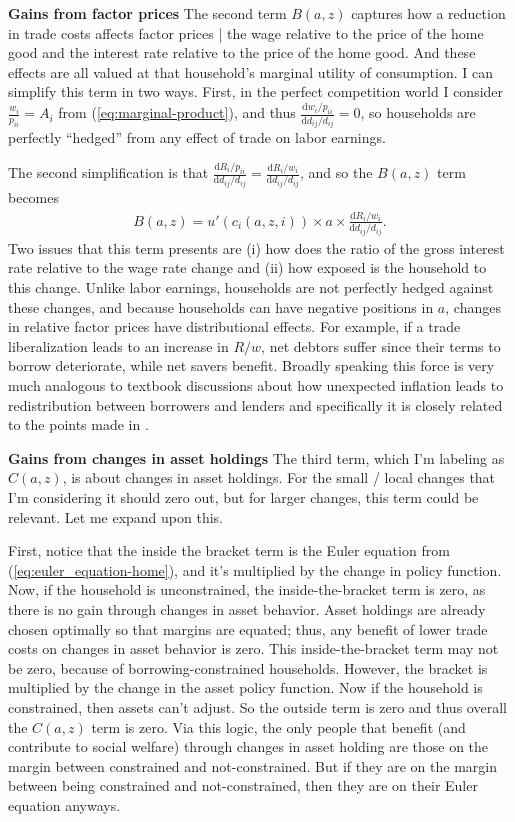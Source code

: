 \documentclass[12pt,pdftex]{article}
\begin{document}
\begin{onehalfspacing}
\textbf{Gains from factor prices} The second term $B(a,z)$ captures how a reduction in trade costs affects factor prices | the wage relative to the price of the home good and the interest rate relative to the price of the home good. And these effects are all valued at that household's marginal utility of consumption. I can simplify this term in two ways. First, in the perfect competition world I consider $\frac{w_i}{p_{ii}} = A_{i}$ from (\ref{eq:marginal-product}), and thus $\frac{\mathrm{d} w_{i} / p_{ii}}{\mathrm{d} d_{ij} / d_{ij}} = 0$, so households are perfectly ``hedged'' from any effect of trade on labor earnings.

The second simplification is that $\frac{\mathrm{d} R_{i} / p_{ii}}{\mathrm{d} d_{ij} / d_{ij}} = \frac{\mathrm{d} R_{i} / w_{i}}{\mathrm{d} d_{ij} / d_{ij}}$, and so the $B(a,z)$ term becomes
\begin{align}
B(a,z) = u'(c_{i}(a,z,i)) \times  a \times \frac{\mathrm{d} R_{i} / w_{i}}{\mathrm{d} d_{ij} / d_{ij}}.
\end{align}
Two issues that this term presents are (i) how does the ratio of the gross interest rate relative to the wage rate change and (ii) how exposed is the household to this change. Unlike labor earnings, households are not perfectly hedged against these changes, and because households can have negative positions in $a$, changes in relative factor prices have distributional effects.  For example, if a trade liberalization leads to an increase in $R / w$, net debtors suffer since their terms to borrow deteriorate, while net savers benefit. Broadly speaking this force is very much analogous to textbook discussions about how unexpected inflation leads to redistribution between borrowers and lenders and specifically it is closely related to the points made in \citet{auclert2019monetary}.


\textbf{Gains from changes in asset holdings} The third term, which I'm labeling as $C(a,z)$, is about changes in asset holdings. For the small / local changes that I'm considering it should zero out, but for larger changes, this term could be relevant. Let me expand upon this.

First, notice that the inside the bracket term is the Euler equation from (\ref{eq:euler_equation-home}), and it's multiplied by the change in policy function. Now, if the household is unconstrained, the inside-the-bracket term is zero, as there is no gain through changes in asset behavior. Asset holdings are already chosen optimally so that margins are equated; thus, any benefit of lower trade costs on changes in asset behavior is zero. This inside-the-bracket term may not be zero, because of borrowing-constrained households. However, the bracket is multiplied by the change in the asset policy function. Now if the household is constrained, then assets can't adjust. So the outside term is zero and thus overall the $C(a,z)$ term is zero. Via this logic, the only people that benefit (and contribute to social welfare) through changes in asset holding are those on the margin between constrained and not-constrained. But if they are on the margin between being constrained and not-constrained, then they are on their Euler equation anyways.


\end{onehalfspacing}
\end{document}
